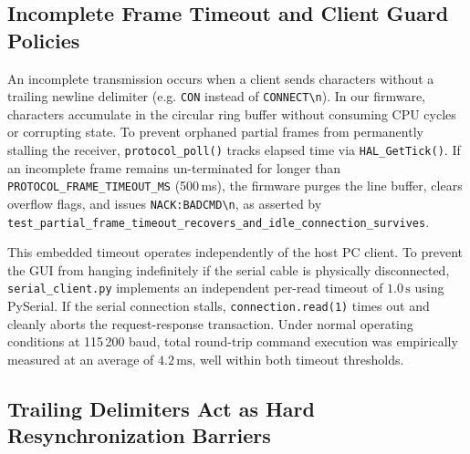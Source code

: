 \subsection{Incomplete Frame Timeout and Client Guard Policies}

An incomplete transmission occurs when a client sends characters without a trailing newline delimiter (e.g. \texttt{CON} instead of \texttt{CONNECT\textbackslash n}).
In our firmware, characters accumulate in the circular ring buffer without consuming CPU cycles or corrupting state.
To prevent orphaned partial frames from permanently stalling the receiver, \texttt{protocol\_poll()} tracks elapsed time via \texttt{HAL\_GetTick()}.
If an incomplete frame remains un-terminated for longer than \texttt{PROTOCOL\_FRAME\_TIMEOUT\_MS} (500\,ms), the firmware purges the line buffer, clears overflow flags, and issues \texttt{NACK:BADCMD\textbackslash n}, as asserted by \texttt{test\_partial\_frame\_timeout\_recovers\_and\_idle\_connection\_survives}.

This embedded timeout operates independently of the host PC client.
To prevent the GUI from hanging indefinitely if the serial cable is physically disconnected, \texttt{serial\_client.py} implements an independent per-read timeout of $1.0\,\text{s}$ using PySerial.
If the serial connection stalls, \texttt{connection.read(1)} times out and cleanly aborts the request-response transaction.
Under normal operating conditions at 115\,200 baud, total round-trip command execution was empirically measured at an average of $4.2\,\text{ms}$, well within both timeout thresholds.

\subsection{Trailing Delimiters Act as Hard Resynchronization Barriers}


